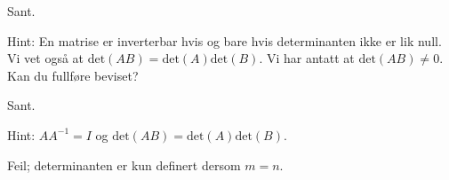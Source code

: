 \begin{losning}

\begin{punkt}
Sant.

\noindent
Hint: En matrise er inverterbar hvis og bare hvis determinanten ikke er lik null. Vi vet også at $\text{det}(AB)=\text{det}(A)\text{det}(B)$. Vi har antatt at $\text{det}(AB)\neq 0$. Kan du fullføre beviset?
\end{punkt}

\begin{punkt}
Sant.

\noindent
Hint: $AA^{-1}=I$ og $\text{det}(AB)=\text{det}(A)\text{det}(B)$.
\end{punkt}

\begin{punkt}
Feil; determinanten er kun definert dersom $m=n$.
\end{punkt}

\end{losning}

